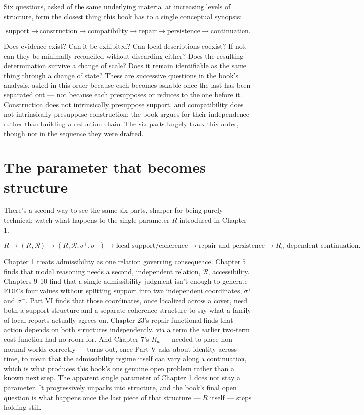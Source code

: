 Six questions, asked of the same underlying material at increasing
levels of structure, form the closest thing this book has to a single
conceptual synopsis:

\[\text{support} \to \text{construction} \to \text{compatibility} \to \text{repair} \to \text{persistence} \to \text{continuation}.\]

Does evidence exist? Can it be exhibited? Can local descriptions coexist?
If not, can they be minimally reconciled without discarding either? Does
the resulting determination survive a change of scale? Does it remain
identifiable as the same thing through a change of state? These are
successive questions in the book's analysis, asked in this order because
each becomes askable once the last has been separated out --- not because
each presupposes or reduces to the one before it. Construction does not
intrinsically presuppose support, and compatibility does not
intrinsically presuppose construction; the book argues for their
independence rather than building a reduction chain. The six parts
largely track this order, though not in the sequence they were drafted.

\hypertarget{the-parameter-that-becomes-structure}{%
\section{The parameter that becomes structure}\label{the-parameter-that-becomes-structure}}

There's a second way to see the same six parts, sharper for being purely
technical: watch what happens to the single parameter \(R\) introduced in
Chapter 1.

\[R \to (R, \mathcal{R}) \to (R, \mathcal{R}, \sigma^+, \sigma^-) \to \text{local support/coherence} \to \text{repair and persistence} \to R_w\text{-dependent continuation}.\]

Chapter 1 treats admissibility as one relation governing consequence.
Chapter 6 finds that modal reasoning needs a second, independent
relation, \(\mathcal{R}\), accessibility. Chapters 9--10 find that a single
admissibility judgment isn't enough to generate FDE's four values without
splitting support into two independent coordinates, \(\sigma^+\) and
\(\sigma^-\). Part VI finds that those coordinates, once localized across a
cover, need both a support structure and a separate coherence structure
to say what a family of local reports actually agrees on. Chapter 23's
repair functional finds that action depends on both structures
independently, via a term the earlier two-term cost function had no room
for. And Chapter 7's \(R_w\) --- needed to place non-normal worlds correctly
--- turns out, once Part V asks about identity across time, to mean that
the admissibility regime itself can vary along a continuation, which is
what produces this book's one genuine open problem rather than a known
next step. The apparent single parameter of Chapter 1 does not stay a
parameter. It progressively unpacks into structure, and the book's final
open question is what happens once the last piece of that structure ---
\(R\) itself --- stops holding still.


